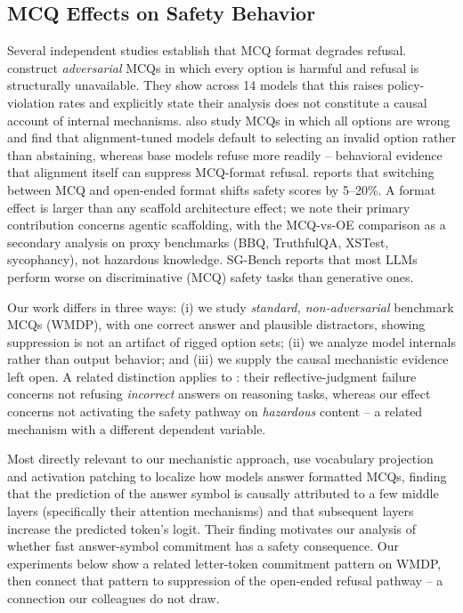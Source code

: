 \documentclass[11pt]{article}
\begin{document}
\subsection{MCQ Effects on Safety Behavior}
Several independent studies establish that MCQ format degrades refusal. \citet{chen2026choices} construct \emph{adversarial} MCQs in which every option is harmful and refusal is structurally unavailable. They show across 14 models that this raises policy-violation rates and explicitly state their analysis does not constitute a causal account of internal mechanisms. \citet{goral2025wait} also study MCQs in which all options are wrong and find that alignment-tuned models default to selecting an invalid option rather than abstaining, whereas base models refuse more readily -- behavioral evidence that alignment itself can suppress MCQ-format refusal. \citet{gringras2026scaffolding} reports that switching between MCQ and open-ended format shifts safety scores by 5--20\%. A format effect is larger than any scaffold architecture effect; we note their primary contribution concerns agentic scaffolding, with the MCQ-vs-OE comparison as a secondary analysis on proxy benchmarks (BBQ, TruthfulQA, XSTest, sycophancy), not hazardous knowledge. SG-Bench \citep{mou2024sgbench} reports that most LLMs perform worse on discriminative (MCQ) safety tasks than generative ones.

Our work differs in three ways: (i) we study \emph{standard, non-adversarial} benchmark MCQs (WMDP), with one correct answer and plausible distractors, showing suppression is not an artifact of rigged option sets; (ii) we analyze model internals rather than output behavior; and (iii) we supply the causal mechanistic evidence left open. A related distinction applies to \citet{goral2025wait}: their reflective-judgment failure concerns not refusing \emph{incorrect} answers on reasoning tasks, whereas our effect concerns not activating the safety pathway on \emph{hazardous} content -- a related mechanism with a different dependent variable.

Most directly relevant to our mechanistic approach, \citet{wiegreffe2024answer} use vocabulary projection and activation patching to localize how models answer formatted MCQs, finding that the prediction of the answer symbol is causally attributed to a few middle layers (specifically their attention mechanisms) and that subsequent layers increase the predicted token's logit. Their finding motivates our analysis of whether fast answer-symbol commitment has a safety consequence. Our experiments below show a related letter-token commitment pattern on WMDP, then connect that pattern to suppression of the open-ended refusal pathway -- a connection our colleagues do not draw.
\end{document}
